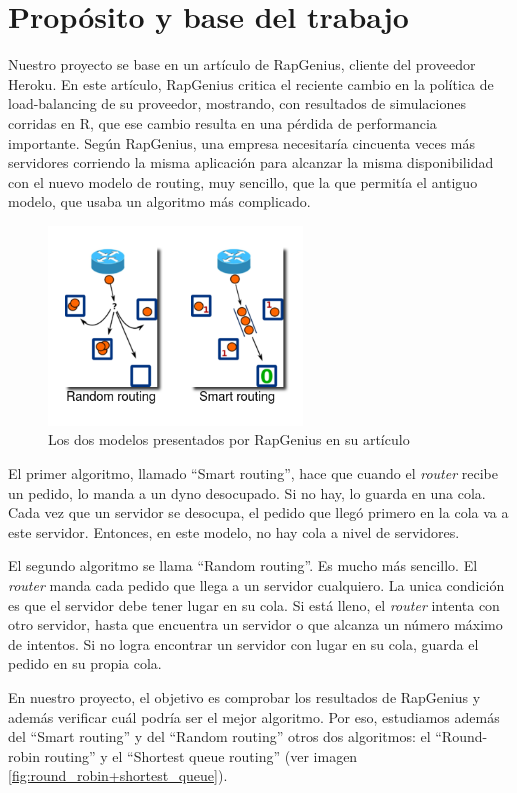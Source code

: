 \section{Propósito y base del trabajo}

Nuestro proyecto se base en un artículo de RapGenius, cliente del proveedor Heroku. En este artículo, RapGenius critica
el reciente cambio en la política de load-balancing de su proveedor, mostrando, con resultados de simulaciones corridas
en R, que ese cambio resulta en una pérdida de performancia importante. Según RapGenius, una empresa necesitaría
cincuenta veces más servidores corriendo la misma aplicación para alcanzar la misma disponibilidad con el nuevo modelo
de routing, muy sencillo, que la que permitía el antiguo modelo, que usaba un algoritmo más complicado.

\begin{figure}[h]
    \centering
    \includegraphics[height=200px]{random-smart.png}
    \caption{Los dos modelos presentados por RapGenius en su artículo}
    \label{fig:random+smart}
\end{figure}

El primer algoritmo, llamado ``Smart routing'', hace que cuando el \textit{router} recibe un pedido, lo manda a un dyno
desocupado. Si no hay, lo guarda en una cola. Cada vez que un servidor se desocupa, el pedido que llegó primero en la
cola va a este servidor. Entonces, en este modelo, no hay cola a nivel de servidores.

El segundo algoritmo se llama ``Random routing''. Es mucho más sencillo. El \textit{router} manda cada pedido que llega
a un servidor cualquiero. La unica condición es que el servidor debe tener lugar en su cola. Si está lleno, el
\textit{router} intenta con otro servidor, hasta que encuentra un servidor o que alcanza un número máximo de intentos.
Si no logra encontrar un servidor con lugar en su cola, guarda el pedido en su propia cola.

En nuestro proyecto, el objetivo es comprobar los resultados de RapGenius y además verificar cuál podría ser el mejor
algoritmo. Por eso, estudiamos además del ``Smart routing'' y del ``Random routing'' otros dos algoritmos: el
``Round-robin routing'' y el ``Shortest queue routing'' (ver imagen \ref{fig:round_robin+shortest_queue}).

